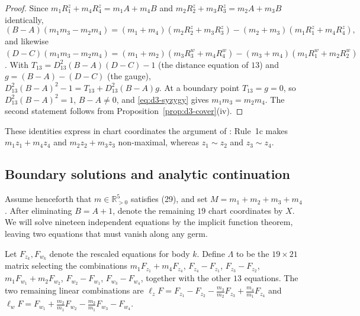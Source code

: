 \documentclass[11pt]{amsart}
\theoremstyle{definition}
\theoremstyle{remark}
\newcommand{\Rp}{\mathbb{R}_{>0}}
\begin{document}
\begin{proof}
Since $m_1R^z_1+m_4R^z_4=m_1A+m_4B$ and $m_2R^z_2+m_3R^z_3=m_2A+m_3B$ identically,
\begin{equation}\label{eq:d3-syzygy}
(B-A)(m_1m_3-m_2m_4)=(m_1+m_4)(m_2R^z_2+m_3R^z_3)-(m_2+m_3)(m_1R^z_1+m_4R^z_4),
\end{equation}
and likewise
$(D-C)(m_1m_3-m_2m_4)=(m_1+m_2)(m_3R^w_3+m_4R^w_4)-(m_3+m_4)(m_1R^w_1+m_2R^w_2)$.  With
$T_{13}=D_{13}^2(B-A)(D-C)-1$ (the distance equation of $13$) and $g=(B-A)-(D-C)$ (the gauge),
$D_{13}^2(B-A)^2-1=T_{13}+D_{13}^2(B-A)g$.  At a boundary point $T_{13}=g=0$, so
$D_{13}^2(B-A)^2=1$, $B-A\ne0$, and \eqref{eq:d3-syzygy} gives $m_1m_3=m_2m_4$.  The second
statement follows from Proposition~\ref{prop:d3-cover}(iv).
\end{proof}

{These identities express in chart coordinates the argument of \cite[\S5.2]{AK}:
Rule~1c makes $m_1z_1+m_4z_4$ and $m_2z_2+m_3z_3$ non-maximal, whereas
$z_1\sim z_2$ and $z_3\sim z_4$.}

\subsection{Boundary solutions and analytic continuation}
{Assume henceforth that $m\in\Rp^5$ satisfies (29), and set
$M=m_1+m_2+m_3+m_4$. After eliminating $B=A+1$, denote the remaining $19$ chart coordinates
by $X$. We will solve nineteen independent equations by the implicit function theorem,
leaving two equations that must vanish along any germ.

Let $F_{z_k},F_{w_k}$ denote the rescaled equations for body $k$.
Define $\Lambda$ to be the $19\times21$ matrix selecting the combinations
$m_1F_{z_1}+m_4F_{z_4}$, $F_{z_4}-F_{z_1}$, $F_{z_3}-F_{z_2}$,
$m_1F_{w_1}+m_2F_{w_2}$, $F_{w_2}-F_{w_1}$, $F_{w_3}-F_{w_4}$,
together with the other $13$ equations. The two remaining linear combinations are
$\ell_zF=F_{z_1}-F_{z_2}-\frac{m_3}{m_2}F_{z_3}+\frac{m_4}{m_1}F_{z_4}$ and
$\ell_wF=F_{w_1}+\frac{m_2}{m_1}F_{w_2}-\frac{m_2}{m_1}F_{w_3}-F_{w_4}$.}
\end{document}
